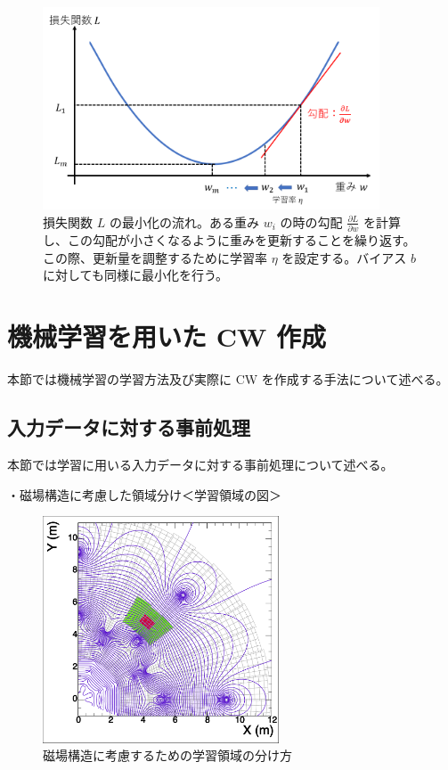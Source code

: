 \begin{figure}[tb]
  \centering
  \includegraphics[clip, width=10cm]{fig/4/lossfunc_laerning.png}
  \caption{損失関数 $L$ の最小化の流れ。ある重み $w_i$ の時の勾配 $\frac{\partial L}{\partial w}$ を計算し、この勾配が小さくなるように重みを更新することを繰り返す。この際、更新量を調整するために学習率 $\eta$ を設定する。バイアス $b$ に対しても同様に最小化を行う。}
  \label{fig:lossfunction}
\end{figure}



\section{機械学習を用いた CW 作成}
本節では機械学習の学習方法及び実際に CW を作成する手法について述べる。

\subsection{入力データに対する事前処理}
本節では学習に用いる入力データに対する事前処理について述べる。

・磁場構造に考慮した領域分け＜学習領域の図＞\\
\begin{figure}[tb]
  \centering
  \includegraphics[clip, width=7cm]{fig/4/c1_withMag.pdf}
  \caption{磁場構造に考慮するための学習領域の分け方}
  \label{fig:Mag}
\end{figure}

